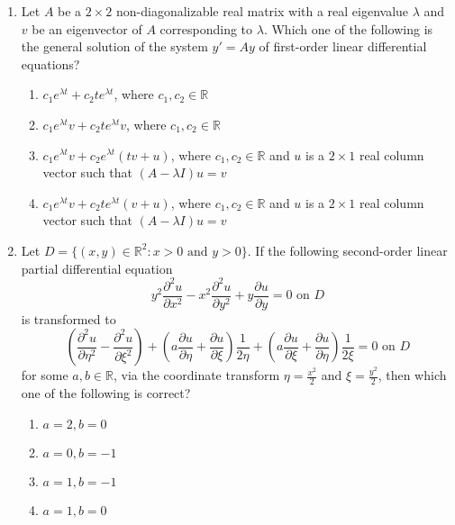 \documentclass[journal]{IEEEtran}
\numberwithin{equation}{enumi}
\numberwithin{figure}{enumi}
\begin{document}
\begin{enumerate}
\item Let $A$ be a $2 \times 2$ non-diagonalizable real matrix with a real eigenvalue $\lambda$ and $v$ be an eigenvector of $A$ corresponding to $\lambda$. Which one of the following is the general solution of the system $y' = Ay$ of first-order linear differential equations?
\begin{enumerate}
    \item $c_1 e^{\lambda t} + c_2 te^{\lambda t}$, where $c_1, c_2 \in \mathbb{R}$
    \item $c_1 e^{\lambda t} v + c_2 t e^{\lambda t} v$, where $c_1, c_2 \in \mathbb{R}$
    \item $c_1 e^{\lambda t} v + c_2 e^{\lambda t} (tv + u)$, where $c_1, c_2 \in \mathbb{R}$ and $u$ is a $2 \times 1$ real column vector such that $(A - \lambda I)u = v$
    \item $c_1 e^{\lambda t} v + c_2 te^{\lambda t} (v + u)$, where $c_1, c_2 \in \mathbb{R}$ and $u$ is a $2 \times 1$ real column vector such that $(A - \lambda I)u = v$
\end{enumerate}
\item Let $D = \{(x, y) \in \mathbb{R}^2 : x > 0 \text{ and } y > 0\}$. If the following second-order linear partial differential equation
\[
y^2 \frac{\partial^2 u}{\partial x^2} - x^2 \frac{\partial^2 u}{\partial y^2} + y \frac{\partial u}{\partial y} = 0 \text{ on } D
\]
is transformed to
\[
\left( \frac{\partial^2 u}{\partial \eta^2} - \frac{\partial^2 u}{\partial \xi^2} \right) + \left( a \frac{\partial u}{\partial \eta} + \frac{\partial u}{\partial \xi} \right) \frac{1}{2 \eta} + \left( a \frac{\partial u}{\partial \xi} + \frac{\partial u}{\partial \eta} \right) \frac{1}{2 \xi} = 0 \text{ on } D
\]
for some $a, b \in \mathbb{R}$, via the coordinate transform $\eta = \frac{x^2}{2}$ and $\xi = \frac{y^2}{2}$, then which one of the following is correct?
\begin{enumerate}
    \item $a = 2, b = 0$
    \item $a = 0, b = -1$
    \item $a = 1, b = -1$
    \item $a = 1, b = 0$
\end{enumerate}

\bigskip


\end{enumerate}
\end{document}
